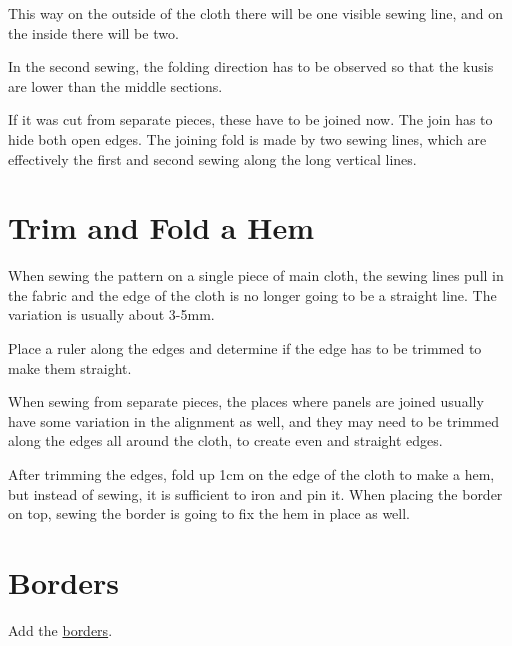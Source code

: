 
This way on the outside of the cloth there will be one visible sewing
line, and on the inside there will be two.

In the second sewing, the folding direction has to be observed so that
the kusis are lower than the middle sections.

If it was cut from separate pieces, these have to be joined now. The
join has to hide both open edges. The joining fold is made by two sewing
lines, which are effectively the first and second sewing along the long
vertical lines.

\section{Trim and Fold a Hem}

When sewing the pattern on a single piece of main cloth, the sewing
lines pull in the fabric and the edge of the cloth is no longer going to
be a straight line. The variation is usually about 3-5mm.

Place a ruler along the edges and determine if the edge has to be
trimmed to make them straight.

When sewing from separate pieces, the places where panels are joined
usually have some variation in the alignment as well, and they may need
to be trimmed along the edges all around the cloth, to create even and
straight edges.

After trimming the edges, fold up 1cm on the edge of the cloth to make a
hem, but instead of sewing, it is sufficient to iron and pin it. When
placing the border on top, sewing the border is going to fix the hem in
place as well.

\section{Borders}

Add the \href{/en/borders}{borders}.

